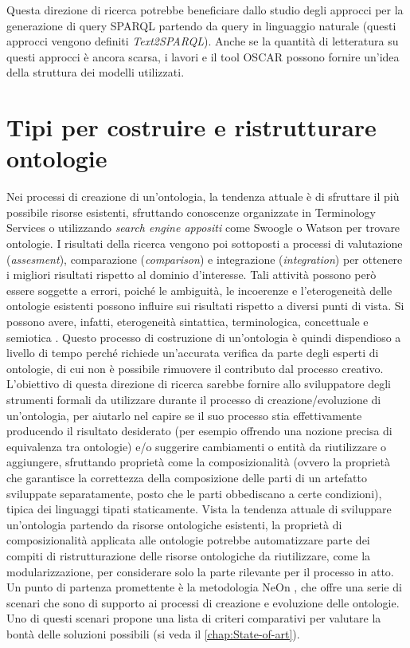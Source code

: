 Questa direzione di ricerca potrebbe beneficiare dallo studio degli approcci per la generazione di query SPARQL partendo da query in linguaggio naturale (questi approcci vengono definiti \textit{Text2SPARQL}). Anche se la quantità di letteratura su questi approcci è ancora scarsa, i lavori \cite{Hu2021NaturalLQ, Evseev2020SPARQLQG} e il tool OSCAR \cite{OSCAR} possono fornire un'idea della struttura dei modelli utilizzati.

\section{Tipi per costruire e ristrutturare ontologie}
Nei processi di creazione di un'ontologia, la tendenza attuale è di sfruttare il più possibile risorse esistenti, sfruttando conoscenze organizzate in 
Terminology Services \cite{ledl2016describing,vandenbussche2017linked} o utilizzando \emph{search engine appositi} come 
Swoogle \cite{swoogle} o Watson \cite{watson} per trovare ontologie. I risultati della ricerca vengono poi sottoposti a processi di valutazione 
(\emph{assesment}), comparazione (\emph{comparison}) e integrazione (\emph{integration}) per ottenere i migliori risultati rispetto al dominio d'interesse. Tali attività possono però essere soggette a errori, poiché le ambiguità, le incoerenze e l'eterogeneità delle ontologie esistenti 
possono influire sui risultati rispetto a diversi punti di vista. Si possono avere, infatti, eterogeneità sintattica, terminologica, concettuale e semiotica \cite{carriero2020OntoReuse}. Questo processo di costruzione di un'ontologia è quindi dispendioso a livello di tempo perché richiede un'accurata verifica da parte degli esperti di ontologie, di cui non è possibile rimuovere il contributo dal processo creativo. L'obiettivo di questa direzione di ricerca sarebbe fornire allo sviluppatore degli strumenti formali da utilizzare durante il processo di creazione/evoluzione di un'ontologia, per aiutarlo nel capire se il suo processo stia effettivamente producendo il risultato desiderato (per esempio offrendo una nozione precisa di equivalenza tra ontologie) e/o suggerire cambiamenti o entità da riutilizzare o aggiungere, sfruttando proprietà come la composizionalità (ovvero la proprietà che garantisce la correttezza della composizione delle parti di un artefatto sviluppate separatamente, posto che le parti obbediscano a certe condizioni), tipica dei linguaggi tipati staticamente. Vista la tendenza attuale di sviluppare un'ontologia partendo da risorse ontologiche esistenti, la proprietà di composizionalità applicata alle ontologie potrebbe automatizzare parte dei compiti di ristrutturazione delle risorse ontologiche da riutilizzare, come la modularizzazione, per considerare solo la parte rilevante per il processo in atto. Un punto di partenza promettente è la metodologia NeOn \cite{NeOn}, che offre una serie di scenari che sono di supporto ai processi di creazione e evoluzione delle ontologie. Uno di questi scenari propone una lista di criteri comparativi per valutare la bontà delle soluzioni possibili (si veda il \autoref{chap:State-of-art}).

